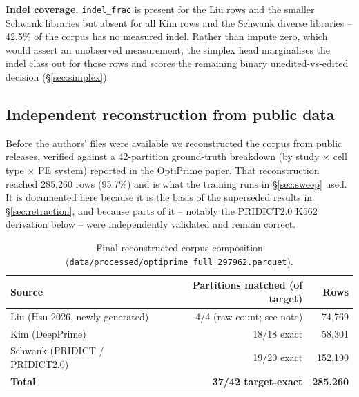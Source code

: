 \documentclass[11pt]{article}
\begin{document}
\textbf{Indel coverage.} \texttt{indel\_frac} is present for the Liu rows and the
smaller Schwank libraries but absent for all Kim rows and the Schwank diverse
libraries -- 42.5\% of the corpus has no measured indel. Rather than impute zero,
which would assert an unobserved measurement, the simplex head marginalises the
indel class out for those rows and scores the remaining binary unedited-vs-edited
decision (\S\ref{sec:simplex}).

\subsection{Independent reconstruction from public data}
\label{sec:reconstruction}

Before the authors' files were available we reconstructed the corpus from public
releases, verified against a 42-partition ground-truth breakdown (by study
$\times$ cell type $\times$ PE system) reported in the OptiPrime paper. That
reconstruction reached 285{,}260 rows (95.7\%) and is what the training runs in
\S\ref{sec:sweep} used. It is documented here because it is the basis of the
superseded results in \S\ref{sec:retraction}, and because parts of it -- notably
the PRIDICT2.0 K562 derivation below -- were independently validated and remain
correct.

\begin{table}[H]
\centering
\caption{Final reconstructed corpus composition
(\texttt{data/processed/optiprime\_full\_297962.parquet}).}
\begin{tabular}{lrr}
\toprule
Source & Partitions matched (of target) & Rows \\
\midrule
Liu (Hsu 2026, newly generated) & 4/4 (raw count; see note) & 74{,}769 \\
Kim (DeepPrime) & 18/18 exact & 58{,}301 \\
Schwank (PRIDICT / PRIDICT2.0) & 19/20 exact & 152{,}190 \\
\midrule
\textbf{Total} & \textbf{37/42 target-exact} & \textbf{285{,}260} \\
\bottomrule
\end{tabular}
\end{table}
\end{document}
